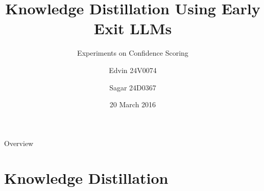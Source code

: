 \documentclass[aspectratio=169,xcolor=dvipsnames]{beamer}
\title{Knowledge Distillation Using Early Exit LLMs}
\subtitle{Experiments on Confidence Scoring}
\author{ Edvin 24V0074 \and Sagar 24D0367 }
\institute
{
    CS 769 \\
    Optimization in Machine Learning %
}
\date{20 March 2016} %
\begin{document}
\begin{frame}
    \titlepage
\end{frame}

\begin{frame}{Overview}
    \tableofcontents
\end{frame}


\section{Knowledge Distillation}
\end{document}
